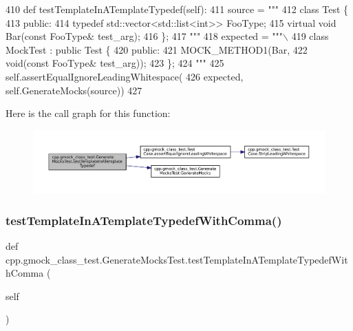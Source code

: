 \begin{DoxyCode}
410   \textcolor{keyword}{def }testTemplateInATemplateTypedef(self):
411     source = \textcolor{stringliteral}{"""}
412 \textcolor{stringliteral}{class Test \{}
413 \textcolor{stringliteral}{ public:}
414 \textcolor{stringliteral}{  typedef std::vector<std::list<int>> FooType;}
415 \textcolor{stringliteral}{  virtual void Bar(const FooType& test\_arg);}
416 \textcolor{stringliteral}{\};}
417 \textcolor{stringliteral}{"""}
418     expected = \textcolor{stringliteral}{"""\(\backslash\)}
419 \textcolor{stringliteral}{class MockTest : public Test \{}
420 \textcolor{stringliteral}{public:}
421 \textcolor{stringliteral}{MOCK\_METHOD1(Bar,}
422 \textcolor{stringliteral}{void(const FooType& test\_arg));}
423 \textcolor{stringliteral}{\};}
424 \textcolor{stringliteral}{"""}
425     self.assertEqualIgnoreLeadingWhitespace(
426         expected, self.GenerateMocks(source))
427 
\end{DoxyCode}
Here is the call graph for this function\+:
\nopagebreak
\begin{figure}[H]
\begin{center}
\leavevmode
\includegraphics[width=350pt]{classcpp_1_1gmock__class__test_1_1GenerateMocksTest_a32a2840352d970c631d7be1b6d1970e6_cgraph}
\end{center}
\end{figure}
\mbox{\label{classcpp_1_1gmock__class__test_1_1GenerateMocksTest_a67d1336b8782257fcfcdbda8c8d4f794}} 
\subsubsection{\texorpdfstring{test\+Template\+In\+A\+Template\+Typedef\+With\+Comma()}{testTemplateInATemplateTypedefWithComma()}}
{\footnotesize\ttfamily def cpp.\+gmock\+\_\+class\+\_\+test.\+Generate\+Mocks\+Test.\+test\+Template\+In\+A\+Template\+Typedef\+With\+Comma (\begin{DoxyParamCaption}\item[{}]{self }\end{DoxyParamCaption})}



